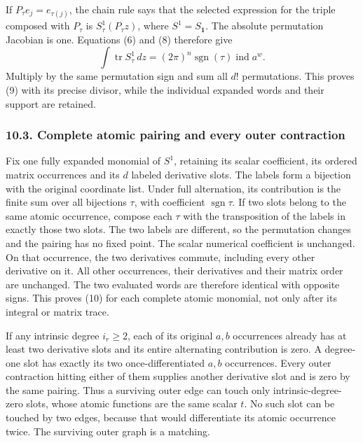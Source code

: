\documentclass[
  11pt,
]{article}
\begin{document}
If \(P_\tau e_j=e_{\tau(j)}\), the chain rule says that the selected
expression for the triple composed with \(P_\tau\) is
\(S^1_\tau(P_\tau z)\), where \(S^1=S_{\mathbf1}\). The absolute
permutation Jacobian is one. Equations (6) and (8) therefore give \[
\int\operatorname{tr}S^1_\tau\,dz
  =(2\pi)^n\operatorname{sgn}(\tau)\operatorname{ind}a^w.
\tag{OE10}
\] Multiply by the same permutation sign and sum all \(d!\)
permutations. This proves (9) with its precise divisor, while the
individual expanded words and their support are retained.

\subsubsection{10.3. Complete atomic pairing and every outer
contraction}\label{complete-atomic-pairing-and-every-outer-contraction}

Fix one fully expanded monomial of \(S^1\), retaining its scalar
coefficient, its ordered matrix occurrences and its \(d\) labeled
derivative slots. The labels form a bijection with the original
coordinate list. Under full alternation, its contribution is the finite
sum over all bijections \(\tau\), with coefficient
\(\operatorname{sgn}\tau\). If two slots belong to the same atomic
occurrence, compose each \(\tau\) with the transposition of the labels
in exactly those two slots. The two labels are different, so the
permutation changes and the pairing has no fixed point. The scalar
numerical coefficient is unchanged. On that occurrence, the two
derivatives commute, including every other derivative on it. All other
occurrences, their derivatives and their matrix order are unchanged. The
two evaluated words are therefore identical with opposite signs. This
proves (10) for each complete atomic monomial, not only after its
integral or matrix trace.

If any intrinsic degree \(i_r\geq2\), each of its original \(a,b\)
occurrences already has at least two derivative slots and its entire
alternating contribution is zero. A degree-one slot has exactly its two
once-differentiated \(a,b\) occurrences. Every outer contraction hitting
either of them supplies another derivative slot and is zero by the same
pairing. Thus a surviving outer edge can touch only
intrinsic-degree-zero slots, whose atomic functions are the same scalar
\(t\). No such slot can be touched by two edges, because that would
differentiate its atomic occurrence twice. The surviving outer graph is
a matching.
\end{document}
